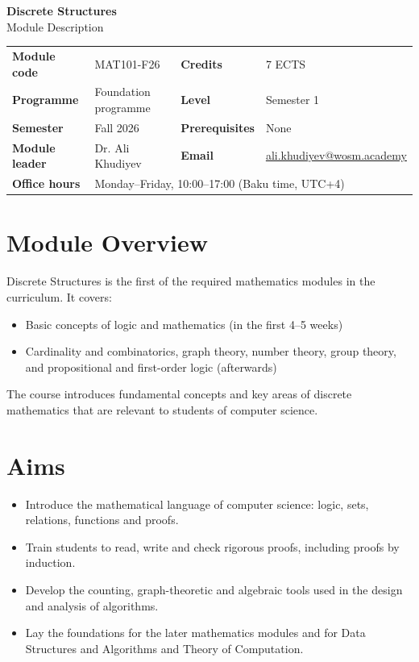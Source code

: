 \documentclass[11pt,a4paper]{article}
\makeatletter
\newcommand{\ModuleTitle}{Discrete Structures}
\newcommand{\ModuleCode}{MAT101-F26}
\newcommand{\Programme}{Foundation programme}
\newcommand{\Level}{Semester 1}
\newcommand{\Semester}{Fall 2026}
\newcommand{\Credits}{7 ECTS}
\newcommand{\ModuleLeader}{Dr. Ali Khudiyev}
\newcommand{\Email}{ali.khudiyev@wosm.academy}
\newcommand{\OfficeHours}{Monday--Friday, 10:00--17:00 (Baku time, UTC+4)}
\newcommand{\Prerequisites}{None}
\makeatother
\begin{document}
\begin{center}
  {\LARGE\bfseries\color{accent} \ModuleTitle}\\[4pt]
  {\large Module Description}
\end{center}
\vspace{6pt}

\begin{tabularx}{\textwidth}{>{\bfseries}l X >{\bfseries}l X}
\toprule
Module code   & \ModuleCode    & Credits      & \Credits \\
Programme     & \Programme     & Level        & \Level \\
Semester      & \Semester      & Prerequisites & \Prerequisites \\
Module leader & \ModuleLeader  & Email        & \href{mailto:\Email}{\Email} \\
Office hours  & \multicolumn{3}{l}{\OfficeHours} \\
\bottomrule
\end{tabularx}

\section{Module Overview}
Discrete Structures is the first of the required mathematics modules in the
curriculum. It covers:
\begin{itemize}
  \item Basic concepts of logic and mathematics (in the first 4--5 weeks)
  \item Cardinality and combinatorics, graph theory, number theory, group theory,
        and propositional and first-order logic (afterwards)
\end{itemize}

The course introduces fundamental concepts and key areas of discrete mathematics
that are relevant to students of computer science.

\section{Aims}
\begin{itemize}
  \item Introduce the mathematical language of computer science: logic, sets,
        relations, functions and proofs.
  \item Train students to read, write and check rigorous proofs, including proofs
        by induction.
  \item Develop the counting, graph-theoretic and algebraic tools used in the design
        and analysis of algorithms.
  \item Lay the foundations for the later mathematics modules and for Data
        Structures and Algorithms and Theory of Computation.
\end{itemize}
\end{document}

